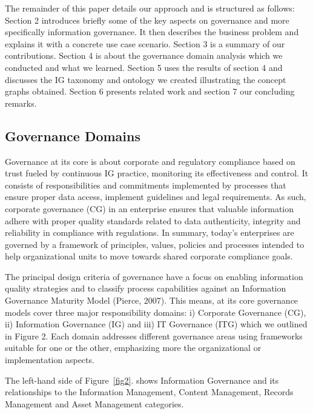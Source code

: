 \documentclass[runningheads]{llncs}
\begin{document}
The remainder of this paper details our approach and is structured as follows: Section 2 introduces briefly some of the key aspects on governance and more specifically information governance. It then describes the business problem and explains it with a concrete use case scenario. Section 3 is a summary of our contributions. Section 4 is about the governance domain analysis which we conducted and what we learned. Section 5 uses the results of section 4 and discusses the IG taxonomy and ontology we created illustrating the concept graphs obtained. Section 6 presents related work and section 7 our concluding remarks.

\subsection{Governance Domains}
Governance at its core is about corporate and regulatory compliance based on trust fueled by continuous IG practice, monitoring its effectiveness and control. It consists of responsibilities and commitments implemented by processes that ensure proper data access, implement guidelines and legal requirements. As such, corporate governance (CG) in an enterprise ensures that valuable information adhere with proper quality standards related to data authenticity, integrity and reliability in compliance with regulations. In summary, today’s enterprises are governed by a framework of principles, values, policies and processes intended to help organizational units to move towards shared corporate compliance goals.

The principal design criteria of governance have a focus on enabling information quality strategies and to classify process capabilities against an Information Governance Maturity Model (Pierce, 2007).
 This means, at its core governance models cover three major responsibility domains: i) Corporate Governance (CG), ii) Information Governance (IG) and iii) IT Governance (ITG) which we outlined in Figure 2. Each domain addresses different governance areas using frameworks suitable for one or the other, emphasizing more the organizational or implementation aspects. 
 
The left-hand side of Figure~\ref{fig2}. shows Information Governance and its relationships to the Information Management, Content Management, Records Management and Asset Management categories.
\end{document}
